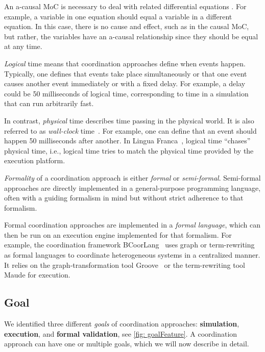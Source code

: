 \documentclass[runningheads]{llncs}
\newcommand{\quotes}[1]{``#1''}
\begin{document}
An a-causal MoC is necessary to deal with related differential equations \cite{lecoentGuaranteedCosimulationCyberphysical2020}.
For example, a variable in one equation should equal a variable in a different equation.
In this case, there is no cause and effect, such as in the causal MoC, but rather, the variables have an a-causal relationship since they should be equal at any time.

\textit{Logical} time means that coordination approaches define when events happen.
Typically, one defines that events take place simultaneously or that one event causes another event immediately or with a fixed delay.
For example, a delay could be 50 milliseconds of logical time, corresponding to time in a simulation that can run arbitrarily fast.

In contrast, \textit{physical} time describes time passing in the physical world.
It is also referred to as \textit{wall-clock} time~\cite{gomesCoSimulationSurvey2019}.
For example, one can define that an event should happen 50 milliseconds after another.
In Lingua Franca~\cite{lohstrohReactorsDeterministicModel2020}, logical time \quotes{chases} physical time, i.e., logical time tries to match the physical time provided by the execution platform.

\textit{Formality} of a coordination approach is either \textit{formal} or \textit{semi-formal}.
Semi-formal approaches are directly implemented in a general-purpose programming language, often with a guiding formalism in mind but without strict adherence to that formalism.

Formal coordination approaches are implemented in a \textit{formal language}, which can then be run on an execution engine implemented for that formalism.
For example, the coordination framework BCoorLang~\cite{krauterBehavioralConsistencyMultimodeling2023} uses graph or term-rewriting as formal languages to coordinate heterogeneous systems in a centralized manner.
It relies on the graph-transformation tool Groove~\cite{rensinkGROOVESimulatorTool2004} or the term-rewriting tool Maude for execution.


\subsection{Goal} %
We identified three different \textit{goals} of coordination approaches: \textbf{simulation}, \textbf{execution}, and \textbf{formal validation}, see \autoref{fig: goalFeature}.
A coordination approach can have one or multiple goals, which we will now describe in detail.
\end{document}
